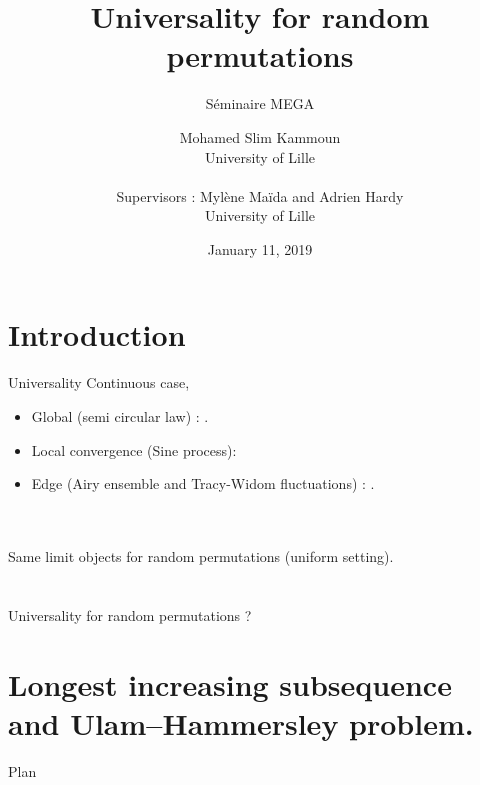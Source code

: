 \documentclass[english]{beamer}
\title{Universality for random permutations}
\subtitle {Séminaire MEGA}
\author 
{ \large{Mohamed Slim Kammoun}
\\ \small{University of Lille} \\ \ \\ \large{Supervisors :  Mylène Maïda  and Adrien Hardy}
\\ \small{University of Lille}
}
\date {  January 11, 2019}
\begin{document}
\begin{frame}
  \titlepage  
\end{frame}



\section*{Introduction}
\begin{frame}{Universality}
 Continuous case, 
    \begin{itemize}
        \item Global (semi circular law) : 
        \cite{10.2307/1970008,Pastur1972}. 
        \item Local convergence (Sine process): \cite*{MR2411912,Erdos2010}
        \item Edge (Airy ensemble and Tracy-Widom fluctuations) : \cite{tao2011}.
     
    \end{itemize}
    \ \\ 
    \ \\ 
    Same limit objects for random permutations (uniform setting).  
    \\
    \ \\ 
        \ \\ 
Universality for  random permutations ?
\end{frame}


\section{Longest increasing subsequence and Ulam–Hammersley problem.}
\begin{frame}{Plan}
\tableofcontents[currentsection,currentsubsection,
    hideothersubsections, 
    sectionstyle=show/shaded,
]
\end{frame}
\end{document}
